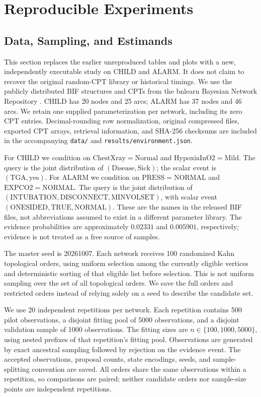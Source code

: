 \section{Reproducible Experiments}
\label{sec:experiments}
\subsection{Data, Sampling, and Estimands}
\label{subsec:experimental-settings}
This section replaces the earlier unreproduced tables and plots with a
new, independently executable study on CHILD and ALARM. It does not
claim to recover the original random-CPT library or historical timings.
We use the publicly distributed BIF structures and CPTs from the
bnlearn Bayesian Network Repository \citep{bnlearnrepository}.
CHILD has 20 nodes and 25 arcs; ALARM has 37 nodes and 46 arcs.
We retain one supplied parameterization per network, including its
zero CPT entries. Decimal-rounding row normalization, original compressed
files, exported CPT arrays, retrieval information, and SHA-256 checksums
are included in the accompanying \texttt{data/} and
\texttt{results/environment.json}.

For CHILD we condition on
$\mathrm{ChestXray}=\mathrm{Normal}$ and
$\mathrm{HypoxiaInO2}=\mathrm{Mild}$.
The query is the joint distribution of $(\mathrm{Disease},\mathrm{Sick})$;
the scalar event is $(\mathrm{TGA},\mathrm{yes})$.
For ALARM we condition on
$\mathrm{PRESS}=\mathrm{NORMAL}$ and
$\mathrm{EXPCO2}=\mathrm{NORMAL}$.
The query is the joint distribution of
$(\mathrm{INTUBATION},\mathrm{DISCONNECT},\mathrm{MINVOLSET})$,
with scalar event $(\mathrm{ONESIDED},\mathrm{TRUE},\mathrm{NORMAL})$.
These are the names in the released BIF files, not abbreviations
assumed to exist in a different parameter library.
The evidence probabilities are approximately $0.02331$ and $0.005901$,
respectively; evidence is not treated as a free source of samples.

The master seed is 20261007. Each network receives 100 randomized Kahn
topological orders, using uniform selection among the currently eligible
vertices and deterministic sorting of that eligible list before selection.
This is not uniform sampling over the set of all topological orders.
We save the full orders and restricted orders instead of relying solely
on a seed to describe the candidate set.

We use 20 independent repetitions per network. Each repetition contains
500 pilot observations, a disjoint fitting pool of 5000 observations,
and a disjoint validation sample of 1000 observations.
The fitting sizes are $n\in\{100,1000,5000\}$, using nested prefixes
of that repetition's fitting pool. Observations are generated by exact
ancestral sampling followed by rejection on the evidence event.
The accepted observations, proposal counts, state encodings, seeds,
and sample-splitting convention are saved. All orders share the same
observations within a repetition, so comparisons are paired;
neither candidate orders nor sample-size points are independent repetitions.

